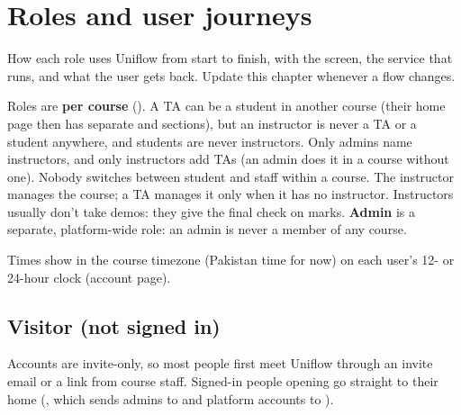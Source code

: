 \chapter{Roles and user journeys}\label{ch:journeys}

How each role uses Uniflow from start to finish, with the screen, the service that runs, and what the user gets back. Update this chapter whenever a flow changes.

Roles are \textbf{per course} (). A TA can be a student in another course (their home page then has separate  and  sections), but an instructor is never a TA or a student anywhere, and students are never instructors. Only admins name instructors, and only instructors add TAs (an admin does it in a course without one). Nobody switches between student and staff within a course. The instructor manages the course; a TA manages it only when it has no instructor. Instructors usually don't take demos: they give the final check on marks. \textbf{Admin} is a separate, platform-wide role: an admin is never a member of any course.

Times show in the course timezone (Pakistan time for now) on each user's 12- or 24-hour clock (account page).

\section{Visitor (not signed in)}\label{sec:journey-visitor}

Accounts are invite-only, so most people first meet Uniflow through an invite email or a link from
course staff. Signed-in people opening \route{/} go straight to their home (,
which sends admins to  and platform accounts to ).

